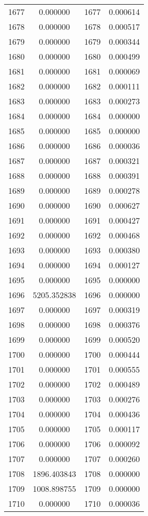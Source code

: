 \documentclass[12pt]{article}
\begin{document}
\begin{longtable}{@{}cccc@{}}
1677 & 0.000000 & 1677 & 0.000614 \\
1678 & 0.000000 & 1678 & 0.000517 \\
1679 & 0.000000 & 1679 & 0.000344 \\
1680 & 0.000000 & 1680 & 0.000499 \\
1681 & 0.000000 & 1681 & 0.000069 \\
1682 & 0.000000 & 1682 & 0.000111 \\
1683 & 0.000000 & 1683 & 0.000273 \\
1684 & 0.000000 & 1684 & 0.000000 \\
1685 & 0.000000 & 1685 & 0.000000 \\
1686 & 0.000000 & 1686 & 0.000036 \\
1687 & 0.000000 & 1687 & 0.000321 \\
1688 & 0.000000 & 1688 & 0.000391 \\
1689 & 0.000000 & 1689 & 0.000278 \\
1690 & 0.000000 & 1690 & 0.000627 \\
1691 & 0.000000 & 1691 & 0.000427 \\
1692 & 0.000000 & 1692 & 0.000468 \\
1693 & 0.000000 & 1693 & 0.000380 \\
1694 & 0.000000 & 1694 & 0.000127 \\
1695 & 0.000000 & 1695 & 0.000000 \\
1696 & 5205.352838 & 1696 & 0.000000 \\
1697 & 0.000000 & 1697 & 0.000319 \\
1698 & 0.000000 & 1698 & 0.000376 \\
1699 & 0.000000 & 1699 & 0.000520 \\
1700 & 0.000000 & 1700 & 0.000444 \\
1701 & 0.000000 & 1701 & 0.000555 \\
1702 & 0.000000 & 1702 & 0.000489 \\
1703 & 0.000000 & 1703 & 0.000276 \\
1704 & 0.000000 & 1704 & 0.000436 \\
1705 & 0.000000 & 1705 & 0.000117 \\
1706 & 0.000000 & 1706 & 0.000092 \\
1707 & 0.000000 & 1707 & 0.000260 \\
1708 & 1896.403843 & 1708 & 0.000000 \\
1709 & 1008.898755 & 1709 & 0.000000 \\
1710 & 0.000000 & 1710 & 0.000036 \\

\end{longtable}
\end{document}
